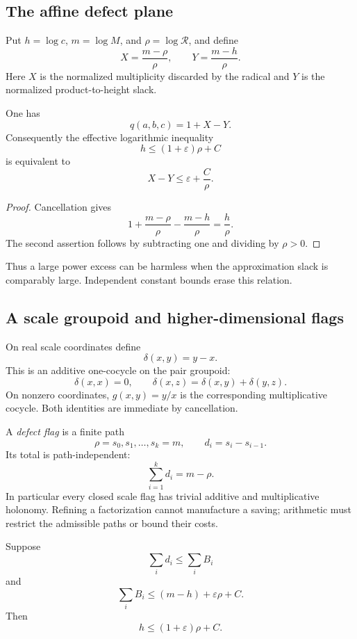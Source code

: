 \subsection{The affine defect plane}

Put $h=\log c$, $m=\log M$, and $\rho=\log \mathcal R$, and define
\[
 X=\frac{m-\rho}{\rho},\qquad
 Y=\frac{m-h}{\rho}.
\]
Here $X$ is the normalized multiplicity discarded by the radical and $Y$ is
the normalized product-to-height slack.

\begin{theorem}
\label{thm:gain-defect-cancellation}
One has
\[
 \boxed{q(a,b,c)=1+X-Y.}
\]
Consequently the effective logarithmic inequality
\[
 h\le(1+\varepsilon)\rho+C
\]
is equivalent to
\[
 X-Y\le\varepsilon+\frac{C}{\rho}.
\]
\end{theorem}

\begin{proof}
Cancellation gives
\[
 1+\frac{m-\rho}{\rho}-\frac{m-h}{\rho}=\frac{h}{\rho}.
\]
The second assertion follows by subtracting one and dividing by $\rho>0$.
\end{proof}

Thus a large power excess can be harmless when the approximation slack is
comparably large.  Independent constant bounds erase this relation.

\subsection{A scale groupoid and higher-dimensional flags}

On real scale coordinates define
\[
 \delta(x,y)=y-x.
\]
This is an additive one-cocycle on the pair groupoid:
\[
 \delta(x,x)=0,
 \qquad
 \delta(x,z)=\delta(x,y)+\delta(y,z).
\]
On nonzero coordinates, $g(x,y)=y/x$ is the corresponding multiplicative
cocycle.  Both identities are immediate by cancellation.

A \emph{defect flag} is a finite path
\[
 \rho=s_0,s_1,\ldots,s_k=m,
 \qquad d_i=s_i-s_{i-1}.
\]
Its total is path-independent:
\[
 \sum_{i=1}^k d_i=m-\rho.
\]
In particular every closed scale flag has trivial additive and multiplicative
holonomy.  Refining a factorization cannot manufacture a saving; arithmetic
must restrict the admissible paths or bound their costs.

\begin{theorem}
\label{thm:defect-budget-half-space}
Suppose
\[
 \sum_i d_i\le\sum_i B_i
\]
and
\[
 \sum_i B_i\le(m-h)+\varepsilon \rho+C.
\]
Then
\[
 h\le(1+\varepsilon)\rho+C.
\]
\end{theorem}

